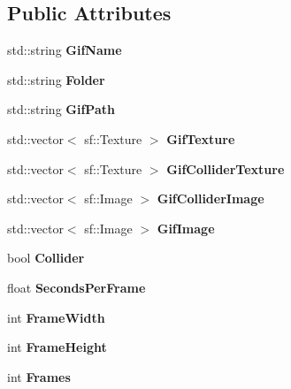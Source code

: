 \subsection*{Public Attributes}
\begin{DoxyCompactItemize}
\item 
\mbox{\label{classtfp_1_1_gif_a794c9ba2f050622fed495954d1a94a83}} 
std\+::string {\bfseries Gif\+Name}
\item 
\mbox{\label{classtfp_1_1_gif_a4fae34894d4c3900ceb97c682ea91b79}} 
std\+::string {\bfseries Folder}
\item 
\mbox{\label{classtfp_1_1_gif_a0185ad09789814120cf68b000de0bbb6}} 
std\+::string {\bfseries Gif\+Path}
\item 
\mbox{\label{classtfp_1_1_gif_a3d4aa8466af8586198106b2544ddf1a8}} 
std\+::vector$<$ sf\+::\+Texture $>$ {\bfseries Gif\+Texture}
\item 
\mbox{\label{classtfp_1_1_gif_ac6fc233a49b74b58b1bc4e1e641f92e5}} 
std\+::vector$<$ sf\+::\+Texture $>$ {\bfseries Gif\+Collider\+Texture}
\item 
\mbox{\label{classtfp_1_1_gif_a474ff90b1c9211e21cda8911dbd3f1c5}} 
std\+::vector$<$ sf\+::\+Image $>$ {\bfseries Gif\+Collider\+Image}
\item 
\mbox{\label{classtfp_1_1_gif_a6e8a9174e56bf516a6f8f1f24b7539f5}} 
std\+::vector$<$ sf\+::\+Image $>$ {\bfseries Gif\+Image}
\item 
\mbox{\label{classtfp_1_1_gif_aaf99e8005cec4d6eae331627abeb4144}} 
bool {\bfseries Collider}
\item 
\mbox{\label{classtfp_1_1_gif_aac9b1814f7f6a8722f2dbbd3dd994278}} 
float {\bfseries Seconds\+Per\+Frame}
\item 
\mbox{\label{classtfp_1_1_gif_adb66cb98d6e88ef1bbb433f132746403}} 
int {\bfseries Frame\+Width}
\item 
\mbox{\label{classtfp_1_1_gif_a47b0b3fb28fb8abb1348a045658b7fcc}} 
int {\bfseries Frame\+Height}
\item 
\mbox{\label{classtfp_1_1_gif_a125b8576dedf046a93d5a24f77dc4575}} 
int {\bfseries Frames}
\end{DoxyCompactItemize}


